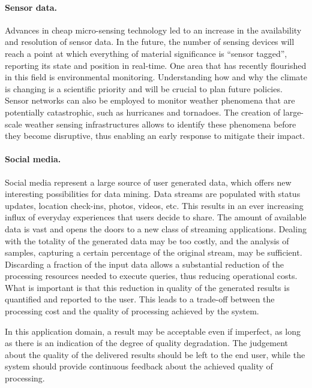 \paragraph{Sensor data.} 
Advances in cheap micro-sensing technology led to an increase in the availability and resolution of
sensor data.
In the future, the number of sensing devices will reach a point at which everything of material
significance is ``sensor tagged'', reporting its state and position in real-time.
One area that has recently flourished in this field is environmental monitoring. 
Understanding how and why the climate is changing is a scientific priority and will be crucial
to plan future policies.
Sensor networks can also be employed to monitor weather phenomena that are potentially
catastrophic, such as hurricanes and tornadoes. 
The creation of large-scale weather sensing infrastructures allows to identify
these phenomena before they become disruptive, thus enabling an early response to mitigate their impact.

\paragraph{Social media.} 
Social media represent a large source of user generated data, which offers new interesting	
possibilities for data mining. 
Data streams are populated with status updates, location check-ins, photos, videos, etc. This results
in an ever increasing influx of everyday experiences that users decide to share. 
The amount of available data is vast and opens the doors to a new class of streaming
applications.
Dealing with the totality of the generated data may be too costly, and the analysis of samples, capturing
a certain percentage of the original stream, may be sufficient.
Discarding a fraction of the input data allows a substantial reduction of the processing
resources needed to execute queries, thus reducing operational costs.
What is important is that this reduction in quality of the generated results is quantified and reported
to the user. 
This leads to a trade-off between the processing cost and the quality of processing achieved by
the system.

In this application domain, a result may
be acceptable even if imperfect, as long as there is an indication of the degree of quality
degradation. The judgement about the quality of the delivered results should be left to the end user,
while the system should provide continuous feedback about the achieved quality of processing.

